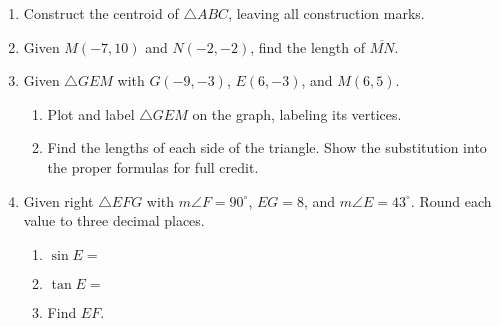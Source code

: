 \documentclass[12pt, oneside]{article}
\begin{document}
\begin{enumerate}
\newpage

\item Construct the centroid of $\triangle ABC$, leaving all construction marks.
  \vspace{5cm}
  \begin{center}
\end{center} \vspace{1.5cm}

\newpage

  \item Given $M(-7,10)$ and $N(-2,-2)$, find the length of $\overline{MN}$.
      \vspace{5cm}

  \item Given $\triangle GEM$ with $G(-9, -3)$, $E(6, -3)$, and $M(6, 5)$.
    \begin{enumerate}
      \item Plot and label $\triangle GEM$ on the graph, labeling its vertices.
      \item Find the lengths of each side of the triangle. Show the substitution into the proper formulas for full credit.
    \end{enumerate}
    \vspace{3cm}


\newpage
\item Given right $\triangle EFG$ with $m\angle F=90^\circ$, $EG=8$, and $m\angle E=43^\circ$. Round each value to three decimal places.  \vspace{0.5cm}
\begin{multicols}{2}
  \begin{enumerate}
    \item $\sin E=$ \vspace{0.8cm}
    \item $\tan E=$ \vspace{0.8cm}
    \item Find $EF$.
  \end{enumerate}
  \begin{center}
      \vspace{2cm}
  \end{center}
\end{multicols}
\vspace{3cm}


\end{enumerate}
\end{document}
